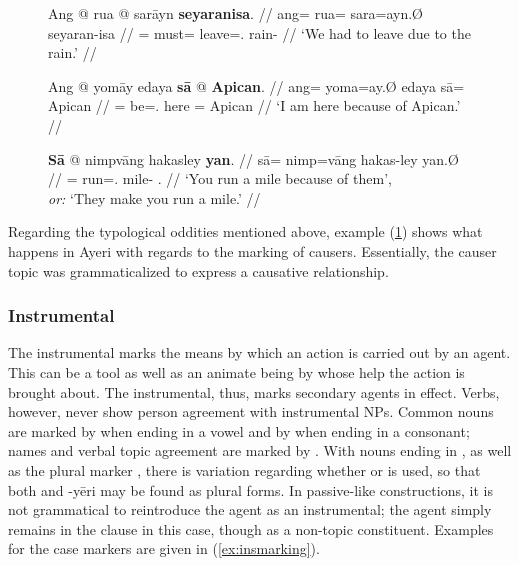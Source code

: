 \begin{figure}[h]
\pex\label{ex:caumarking}
\a\begingl
	\gla Ang @ rua @ sarāyn \textbf{seyaranisa}. //
	\glb ang= rua= sara=ayn.Ø seyaran-isa //
	\glc \AgtT{}= must= leave=\Fpl{}.\Top{} rain-\Caus{} //
	\glft `We had to leave due to the rain.' //
\endgl

\a\begingl
	\gla Ang @ yomāy edaya \textbf{sā} @ \textbf{Apican}. //
	\glb ang= yoma=ay.Ø edaya sā= Apican //
	\glc \AgtT{}= be=\Fsg{}.\Top{} here \Caus{}= Apican //
	\glft `I am here because of Apican.' //
\endgl

\a\label{ex:caustop}\begingl
	\gla \textbf{Sā} @ nimpvāng hakasley \textbf{yan}. //
	\glb sā= nimp=vāng hakas-ley yan.Ø //
	\glc \CauT{}= run=\Second{}.\Aarg{} mile-\PargI{} \TplM{}.\Top{} //
	\glft `You run a mile because of them',\\
		\textit{or:} `They make you run a mile.' //
\endgl
\xe
\end{figure}

Regarding the typological oddities mentioned above, example (\ref{ex:caustop}) 
shows what happens in Ayeri with regards to the marking of causers. 
Essentially, the causer topic was grammaticalized to express a causative 
relationship.


\subsubsection{Instrumental}
\label{subsubsec:instrumental}

The instrumental marks the means by which an action is carried out by an agent.
This can be a tool as well as an animate being by whose help the action is
brought about. The instrumental, thus, marks secondary agents in effect. Verbs,
however, never show person agreement with instrumental NPs. Common nouns are
marked by  when ending in a vowel and by 
when ending in a consonant; names and verbal topic agreement are marked by
. With nouns ending in , as well as the plural marker
, there is variation regarding whether  or 
 is used, so that both  and 
{-yēri} may be found as plural forms. In passive-like constructions, it is not
grammatical to reintroduce the agent as an instrumental; the agent simply
remains in the clause in this case, though as a non-topic constituent. Examples
for the case markers are given in (\ref{ex:insmarking}).


